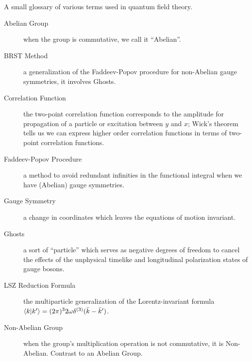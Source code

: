 A small glossary of various terms used in quantum field theory.
\begin{description}
\item[Abelian Group] when the group is commutative, we call it
  ``Abelian''.
\item[BRST Method] a generalization of the Faddeev-Popov
  procedure for non-Abelian gauge symmetries, it involves Ghosts.
\item[Correlation Function] the two-point correlation function
  corresponds to the amplitude for propagation of a
  particle or excitation between $y$ and $x$; Wick's theorem
  tells us we can express higher order correlation functions in
  terms of two-point correlation functions.
\item[Faddeev-Popov Procedure] a method to avoid redundant infinities in
  the functional integral when we have (Abelian) gauge symmetries.
\item[Gauge Symmetry] a change in coordinates which leaves the
  equations of motion invariant.
\item[Ghosts] a sort of ``particle'' which serves as negative
  degrees of freedom to cancel the effects of the unphysical
  timelike and longitudinal polarization states of gauge bosons.
\item[LSZ Reduction Formula] the multiparticle generalization of
  the Lorentz-invariant formula $\langle k|k'\rangle=(2\pi)^{3}2\omega\delta^{(3)}(\bar{k}-\bar{k}')$.
\item[Non-Abelian Group] when the group's multiplication
  operation is not commutative, it is Non-Abelian. Contrast to an
  Abelian Group.
\end{description}
